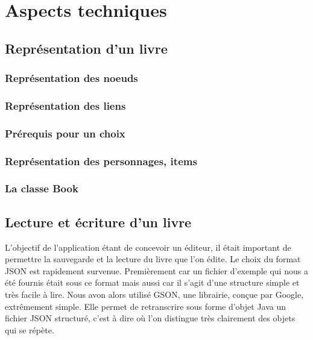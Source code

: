 \chapter{Aspects techniques}

	\section{Représentation d'un livre}
		\label{sec:representation_livre}

		\subsection{Représentation des noeuds}



		\subsection{Représentation des liens}



		\subsection{Prérequis pour un choix}



		\subsection{Représentation des personnages, items}

			

		\subsection{La classe Book}



	\section{Lecture et écriture d'un livre}

		L'objectif de l'application étant de concevoir un éditeur, il était important de permettre la sauvegarde et la lecture du livre que l'on édite. Le choix du format JSON est rapidement survenue. Premièrement car un fichier d'exemple qui nous a été fournis était sous ce format mais aussi car il s'agit d'une structure simple et très facile à lire. Nous avon alors utilisé GSON, une librairie, conçue par Google, extrêmement simple. Elle permet de retranscrire sous forme d'objet Java un fichier JSON structuré, c'est à dire où l'on distingue très clairement des objets qui se répète.

